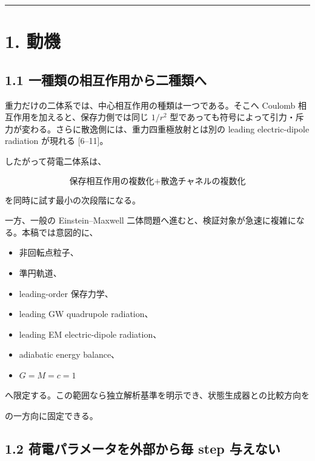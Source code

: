 \documentclass[
  a4paper,
]{ltjsarticle}
\providecommand{\tightlist}{%
  \setlength{\itemsep}{0pt}\setlength{\parskip}{0pt}}
\begin{document}
\begin{center}\rule{0.5\linewidth}{0.5pt}\end{center}

\section{1. 動機}\label{ux52d5ux6a5f}

\subsection{1.1
一種類の相互作用から二種類へ}\label{ux4e00ux7a2eux985eux306eux76f8ux4e92ux4f5cux7528ux304bux3089ux4e8cux7a2eux985eux3078}

重力だけの二体系では、中心相互作用の種類は一つである。そこへ Coulomb
相互作用を加えると、保存力側では同じ \(1/r^2\)
型であっても符号によって引力・斥力が変わる。さらに散逸側には、重力四重極放射とは別の
leading electric-dipole radiation が現れる {[}6--11{]}。

したがって荷電二体系は、

\[
\boxed{
\text{保存相互作用の複数化}
+
\text{散逸チャネルの複数化}
}
\]

を同時に試す最小の次段階になる。

一方、一般の Einstein--Maxwell
二体問題へ進むと、検証対象が急速に複雑になる。本稿では意図的に、

\begin{itemize}
\tightlist
\item
  非回転点粒子、
\item
  準円軌道、
\item
  leading-order 保存力学、
\item
  leading GW quadrupole radiation、
\item
  leading EM electric-dipole radiation、
\item
  adiabatic energy balance、
\item
  \(G=M=c=1\)
\end{itemize}

へ限定する。この範囲なら独立解析基準を明示でき、状態生成器との比較方向を

\begin{center}
\end{center}

の一方向に固定できる。

\subsection{1.2 荷電パラメータを外部から毎 step
与えない}\label{ux8377ux96fbux30d1ux30e9ux30e1ux30fcux30bfux3092ux5916ux90e8ux304bux3089ux6bce-step-ux4e0eux3048ux306aux3044}
\end{document}
